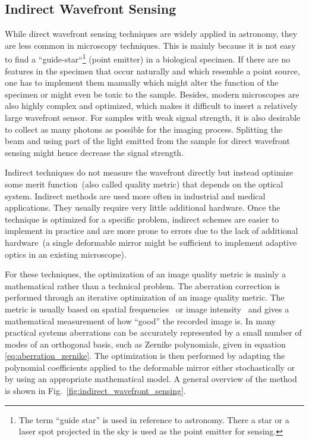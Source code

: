 \subsection{Indirect Wavefront Sensing}
\label{sec:IndirectWavefrontSensing}

While direct wavefront sensing techniques are widely applied in astronomy, they are less common in microscopy techniques. This is mainly because it is not easy to find a ``guide-star``\footnote{The term ``guide star'' is used in reference to astronomy. There a star or a laser spot projected in the sky is used as the point emitter for sensing.} (point emitter) in a biological specimen. If there are no features in the specimen that occur naturally and which resemble a point source, one has to implement them manually which might alter the function of the specimen or might even be toxic to the sample. Besides, modern microscopes are also highly complex and optimized, which makes it difficult to insert a relatively large wavefront sensor. For samples with weak signal strength, it is also desirable to collect as many photons as possible for the imaging process. Splitting the beam and using part of the light emitted from the sample for direct wavefront sensing might hence decrease the signal strength.

Indirect techniques do not measure the wavefront directly but instead optimize some merit function~(also called quality metric) that depends on the optical system. Indirect methods are used more often in industrial and medical applications. They usually require very little additional hardware. Once the technique is optimized for a specific problem, indirect schemes are easier to implement in practice and are more prone to errors due to the lack of additional hardware~(a single deformable mirror might be sufficient to implement adaptive optics in an existing microscope). 

For these techniques, the optimization of an image quality metric is mainly a mathematical rather than a technical problem. The aberration correction is performed through an iterative optimization of an image quality metric. The metric is usually based on spatial frequencies~\cite{wide_AOM_loew_freq} or image intensity~\cite{indirect_metric_intensity} and gives a mathematical measurement of how ``good'' the recorded image is. In many practical systems aberrations can be accurately represented by a small number of modes of an orthogonal basis, such as Zernike polynomials, given in equation \eqref{eq:aberration_zernike}. The optimization is then performed by adapting the polynomial coefficients applied to the deformable mirror either stochastically or by using an appropriate mathematical model. A general overview of the method is shown in Fig.~\ref{fig:indirect_wavefront_sensing}.

